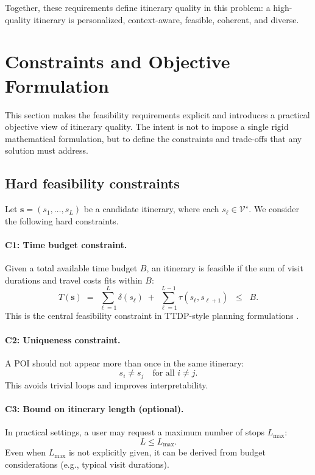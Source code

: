 Together, these requirements define itinerary quality in this problem: a high-quality itinerary is personalized, context-aware, feasible, coherent, and diverse.

\section{Constraints and Objective Formulation}
\label{sec:prob-constraints}

This section makes the feasibility requirements explicit and introduces a practical objective view of itinerary quality. The intent is not to impose a single rigid mathematical formulation, but to define the constraints and trade-offs that any solution must address.

\subsection{Hard feasibility constraints}
Let $\mathbf{s}=(s_1,\dots,s_L)$ be a candidate itinerary, where each $s_\ell \in \mathcal{V}^{\star}$. We consider the following hard constraints.

\paragraph{C1: Time budget constraint.}
Given a total available time budget $B$, an itinerary is feasible if the sum of visit durations and travel costs fits within $B$:
\[
T(\mathbf{s}) \;=\; \sum_{\ell=1}^{L}\delta(s_\ell) \;+\; \sum_{\ell=1}^{L-1}\tau(s_\ell, s_{\ell+1})
\;\;\le\;\; B.
\]
This is the central feasibility constraint in TTDP-style planning formulations \citep{gavalas2014ttdp}.

\paragraph{C2: Uniqueness constraint.}
A POI should not appear more than once in the same itinerary:
\[
s_i \neq s_j \quad \text{for all } i \neq j.
\]
This avoids trivial loops and improves interpretability.

\paragraph{C3: Bound on itinerary length (optional).}
In practical settings, a user may request a maximum number of stops $L_{\max}$:
\[
L \le L_{\max}.
\]
Even when $L_{\max}$ is not explicitly given, it can be derived from budget considerations (e.g., typical visit durations).

